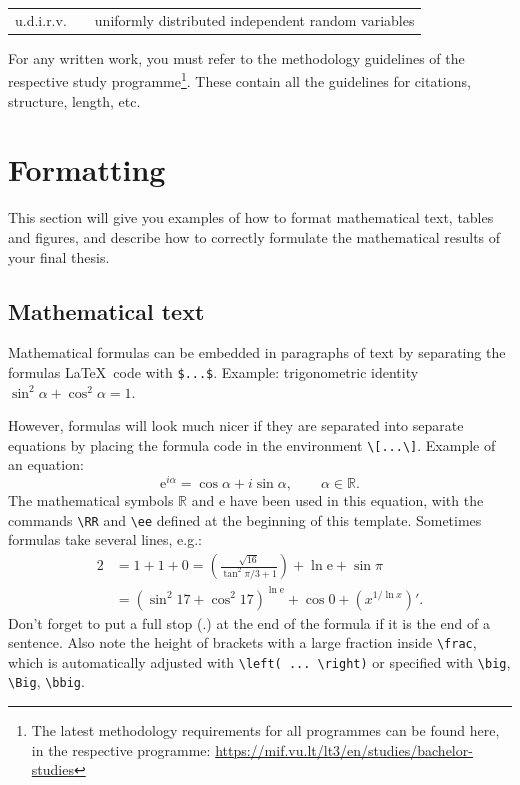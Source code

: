 \documentclass[]{VUMIFTemplateClass}
\newcommand{\ee}{{\mathrm e}}  %
\newcommand{\RR}{\mathbb{R}}
\begin{document}
\begin{tabular}{rcp{}}
    {u.d.i.r.v.} & {} & {uniformly distributed independent random variables}
\end{tabular}

For any written work, you must refer to the methodology guidelines of the respective study programme\footnote{The latest methodology requirements for all programmes can be found here, in the respective programme: \url{https://mif.vu.lt/lt3/en/studies/bachelor-studies}}. These contain all the guidelines for citations, structure, length, etc.


\section{Formatting}

This section will give you examples of how to format mathematical text, tables and figures, and describe how to correctly formulate the mathematical results of your final thesis.

\subsection{Mathematical text}

Mathematical formulas can be embedded in paragraphs of text by separating the formulas \LaTeX~code with \texttt{\$...\$}. Example: trigonometric identity $\sin^2 \alpha + \cos^2 \alpha = 1$.

However, formulas will look much nicer if they are separated into separate equations by placing the formula code in the environment \texttt{\textbackslash[...\textbackslash]}. Example of an equation:
\[
\ee^{i \alpha} = \cos{\alpha} + i \sin{\alpha}, \qquad \alpha \in \RR.
\]
The mathematical symbols $\RR$ and $\ee$ have been used in this equation, with the commands \texttt{\textbackslash RR} and \texttt{\textbackslash ee} defined at the beginning of this template. Sometimes formulas take several lines, e.g.:
\begin{equation}
\begin{split}
2&= 1+1+0=\left(\frac{\sqrt{16}}{\tan^2\pi/3+1}\right) +\ln\ee+\sin\pi\\
&= (\sin^2 17+\cos^2 17)^{\ln\ee}+\cos 0 +(x^{1/\ln x})'. 
\label{form1}
\end{split}
\end{equation}
Don't forget to put a full stop (.) at the end of the formula if it is the end of a sentence. Also note the height of brackets with a large fraction inside \texttt{\textbackslash frac}, which is automatically adjusted with \texttt{\textbackslash left( ... \textbackslash right)} or specified with \texttt{\textbackslash big}, \texttt{\textbackslash Big}, \texttt{\textbackslash bbig}.
\end{document}
